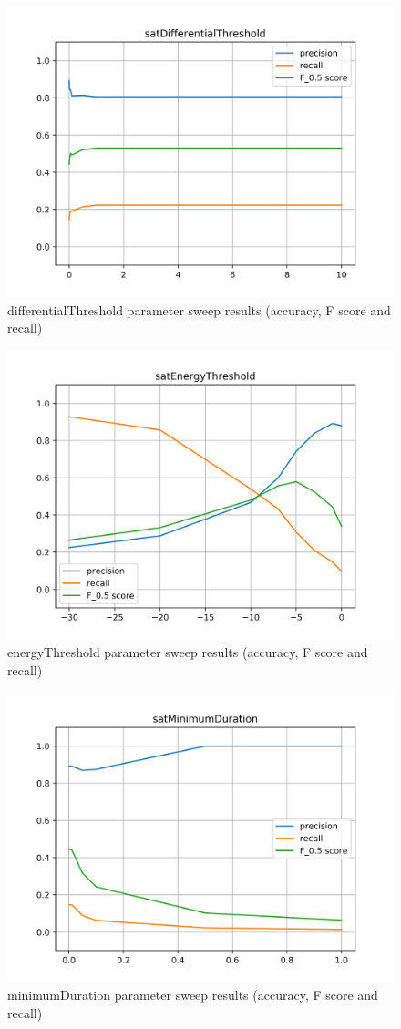 \begin{figure}[H]
	\includegraphics[clip,width=0.7\columnwidth]{Figures/satDifferentialThreshold.png}%
	\caption{differentialThreshold parameter sweep results (accuracy, F score and recall)}
	\label{fig:satDifferentialThreshold}
\end{figure}

\begin{figure}[H]
	\includegraphics[clip,width=0.7\columnwidth]{Figures/satEnergyThreshold.png}%
	\caption{energyThreshold parameter sweep results (accuracy, F score and recall)}
	\label{fig:satEnergyThreshold}
\end{figure}

\begin{figure}[H]
	\includegraphics[clip,width=0.7\columnwidth]{Figures/satMinimumDuration.png}%
	\caption{minimumDuration parameter sweep results (accuracy, F score and recall)}
	\label{fig:satMinimumDuration}
\end{figure}

